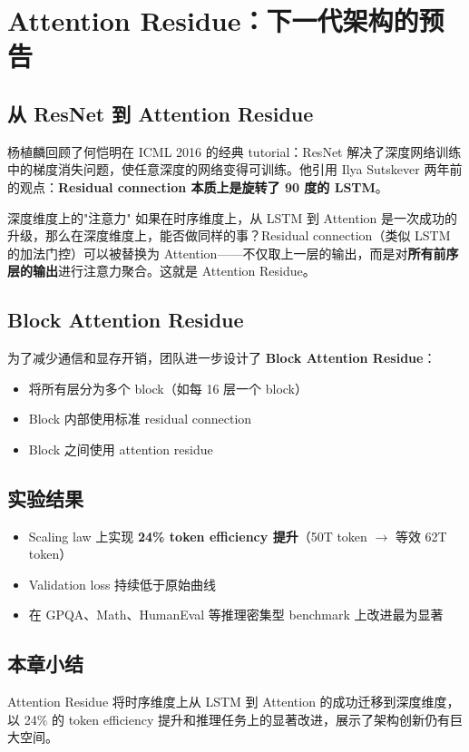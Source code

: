\section{Attention Residue：下一代架构的预告}

\subsection{从 ResNet 到 Attention Residue}

杨植麟回顾了何恺明在 ICML 2016 的经典 tutorial：ResNet 解决了深度网络训练中的梯度消失问题，使任意深度的网络变得可训练。他引用 Ilya Sutskever 两年前的观点：\textbf{Residual connection 本质上是旋转了 90 度的 LSTM}。

\begin{knowledgebox}{深度维度上的"注意力"}
如果在时序维度上，从 LSTM 到 Attention 是一次成功的升级，那么在深度维度上，能否做同样的事？Residual connection（类似 LSTM 的加法门控）可以被替换为 Attention——不仅取上一层的输出，而是对\textbf{所有前序层的输出}进行注意力聚合。这就是 Attention Residue。
\end{knowledgebox}

\subsection{Block Attention Residue}

为了减少通信和显存开销，团队进一步设计了 \textbf{Block Attention Residue}：
\begin{itemize}
    \item 将所有层分为多个 block（如每 16 层一个 block）
    \item Block 内部使用标准 residual connection
    \item Block 之间使用 attention residue
\end{itemize}

\subsection{实验结果}

\begin{itemize}
    \item Scaling law 上实现 \textbf{24\% token efficiency 提升}（50T token $\rightarrow$ 等效 62T token）
    \item Validation loss 持续低于原始曲线
    \item 在 GPQA、Math、HumanEval 等推理密集型 benchmark 上改进最为显著
\end{itemize}

\subsection{本章小结}

Attention Residue 将时序维度上从 LSTM 到 Attention 的成功迁移到深度维度，以 24\% 的 token efficiency 提升和推理任务上的显著改进，展示了架构创新仍有巨大空间。


